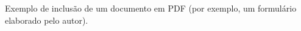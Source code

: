 \label{ap:D}

Exemplo de inclusão de um documento em PDF (por exemplo, um formulário elaborado pelo autor).


